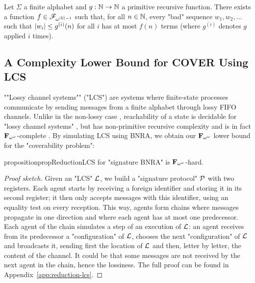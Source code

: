 \begin{theorem}
	\label{thm:lengthfcttheorem}
	Let $\Sigma$ a finite alphabet and $g : \mathbb{N} \to \mathbb{N}$ a primitive recursive function.
	There exists a function $f \in \mathscr{F}_{\omega^{|\Sigma| - 1}}$ such that, for all $n \in \mathbb{N}$, every "bad" sequence $w_1, w_2, \ldots$ such that $|w_i| \leq g^{(i)}(n)$ for all $i$ has at most $f(n)$ terms (where $g^{(i)}$ denotes $g$ applied $i$ times). 
\end{theorem}



\subsection{A Complexity Lower Bound for COVER Using LCS}

""Lossy channel systems"" ("LCS") are systems where finite-state processes communicate by sending messages from a finite alphabet through lossy FIFO channels. Unlike in the non-lossy case \cite{BZ83}, reachability of a state is decidable for "lossy channel systems" \cite{AbdullaJ1996verif}, but has non-primitive recursive complexity \cite{Schnoebelen2002verifying} and is in fact $\mathbf{F}_{\omega^{\omega}}$-complete \cite{ChambartS08ordinal}. 
By simulating LCS using BNRA, we obtain our $\mathbf{F}_{\omega^{\omega}}$ lower bound for the "coverability problem":

\begin{restatable}{proposition}{propReductionLCS}
	\label{prop:reduction-LCS}
	\COVER for "signature BNRA" is $\mathbf{F}_{\omega^\omega}$-hard.
\end{restatable}
\begin{proof}[Proof sketch]
Given an "LCS" $\mathcal{L}$, we build a "signature protocol" $\mathcal{P}$ with two registers. 
Each agent starts by receiving a foreign identifier and storing it in its second register; it then only accepts messages with this identifier, using an equality test on every reception.
 This way, agents form chains where messages propagate in one direction and where each agent has at most one predecessor. 
 Each agent of the chain simulates a step of an execution of $\mathcal{L}$: an agent receives from its predecessor a "configuration" of $\mathcal{L}$, chooses the next "configuration" of $\mathcal{L}$ and broadcasts it, sending first the location of $\mathcal{L}$ and then, letter by letter, the content of the channel. 
 It could be that some messages are not received by the next agent in the chain, hence the lossiness. 
 The full proof can be found in Appendix~\ref{app:reduction-lcs}. 
\end{proof}




